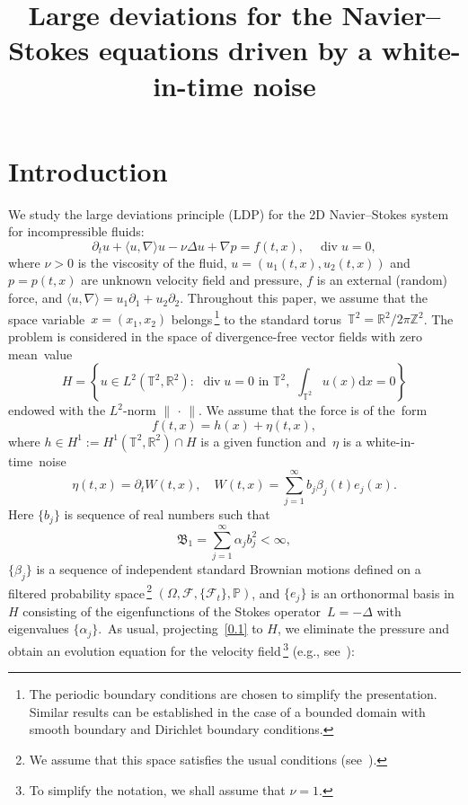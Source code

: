 \documentclass[AHL,Unicode,longabstracts]{cedram}
\title[Large deviations for the Navier--Stokes equations]{Large deviations for the Navier--Stokes equations driven by a white-in-time noise}
\author[\initial{V.} \lastname{Nersesyan}]{\firstname{Vahagn} \lastname{Nersesyan}}
\DeclareMathOperator{\diver}{div}
\newcommand{\p}{\partial}
\newcommand{\R}{{\mathbb R}}
\newcommand{\Z}{{\mathbb Z}}
\newcommand{\pP}{{\mathbb P}}
\newcommand{\T}{{\mathbb T}}
\newcommand{\FF}{{\mathcal F}}
\newcommand{\ty}{\infty}
\newcommand{\BBBB}{{\mathfrak B}}
\newcommand{\lag}{\langle}
\newcommand{\rag}{\rangle}
\newcommand{\dd}{\mathrm{d}}
\begin{document}
\maketitle

\section{Introduction}\label{S:0}

We study the large deviations principle (LDP) for the 2D Navier--Stokes system for incompressible fluids:
\begin{equation}\label{0.1}
\p_t u+\langle u,\nabla \rangle u-\nu\Delta u+\nabla p=f(t,x), \quad\diver u=0,
\end{equation}
where $\nu>0$ is the viscosity of the fluid, $u = (u_1(t,x), u_2(t,x))$ and~$p = p(t, x)$ are unknown velocity field and pressure, $f$ is an external (random) force, and $\lag u, \nabla \rag=u_1\partial_1+u_2\partial_2$. Throughout this paper, we assume that the space variable~$x = (x_1, x_2)$ belongs\,\footnote{The periodic boundary conditions are chosen to simplify the presentation. Similar results can be established in the case of a bounded domain with smooth boundary and Dirichlet boundary conditions.} to the standard torus~$\T^2=\R^2/2\pi\Z^2$. The problem is considered in the space of divergence-free vector fields with zero mean~value
\begin{equation}\label{space1}
H= \left\{u\in L^2(\T^2,\R^2):\,\, \diver u=0 \,\, \text{in $\T^2$,} \,\,\,\int_{\T^2} u(x) \dd x=0 \right\}
\end{equation}
endowed with the $L^2$-norm $\|{\,\cdot\,}\|$. We assume that the force is of the~form
\[
f(t,x)=h(x)+ \eta(t,x),
\]
where $ h\in H^1:= H^1(\T^2, \R^2)\cap H$ is a given function and~$\eta$ is a white-in-time~noise
\begin{equation}\label{0.2}
\eta(t,x)= \p_t W(t,x),\quad W(t,x)=\sum_{j=1}^\ty b_j\beta_j(t) e_j(x).
\end{equation}
Here $\{b_j\}$ is sequence of real numbers such that
\begin{equation}
{\BBBB_{1}}=\sum_{j=1}^\ty \alpha_j b_j^2<\ty, \label{0.3}
\end{equation}
$\{\beta_j\} $ is a sequence of independent standard Brownian motions defined on a filtered probability space\,\footnote{We assume that this space satisfies the usual conditions (see~\cite[Definition~2.25]{KS1991}).} $(\Omega,\FF, \{\FF_t\}, \pP)$, and $\{e_j\}$ is an orthonormal basis in $H$ consisting of the eigenfunctions of the Stokes operator~$L=- \Delta $ with eigenvalues $\{\alpha_j\}$.~As usual, projecting~\eqref{0.1} to $H$, we eliminate the pressure and obtain an evolution equation for the velocity field\,\footnote{To simplify the notation, we shall assume that $\nu = 1$.} (e.g., see~\cite[Chapter~1, Section~6]{lions1969}):
\end{document}
